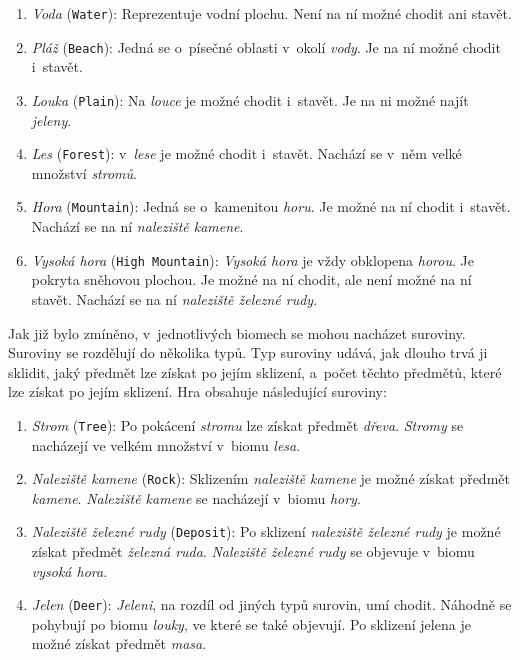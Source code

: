 \begin{enumerate}
    \item \textit{Voda} (\verb|Water|): Reprezentuje vodní plochu. Není na ní možné chodit ani stavět.
    \item \textit{Pláž} (\verb|Beach|): Jedná se o~písečné oblasti v~okolí \textit{vody}. Je na ní možné chodit i~stavět.
    \item \textit{Louka} (\verb|Plain|): Na \textit{louce} je možné chodit i~stavět. Je na ni možné najít \textit{jeleny}.
    \item \textit{Les} (\verb|Forest|): v~\textit{lese} je možné chodit i~stavět. Nachází se v~něm velké množství \textit{stromů}.
    \item \textit{Hora} (\verb|Mountain|): Jedná se o~kamenitou \textit{horu}. Je možné na ní chodit i~stavět. Nachází se na ní \textit{naleziště kamene}.
    \item \textit{Vysoká hora} (\verb|High Mountain|): \textit{Vysoká hora} je vždy obklopena \textit{horou}. Je pokryta sněhovou plochou. Je možné na ní chodit, ale není možné na ní stavět. Nachází se na ní \textit{naleziště železné rudy}.
\end{enumerate}

Jak již bylo zmíněno, v~jednotlivých biomech se mohou nacházet suroviny. Suroviny se rozdělují do několika typů. Typ suroviny udává, jak dlouho trvá ji sklidit, jaký předmět lze získat po jejím sklizení, a~počet těchto předmětů, které lze získat po jejím sklizení. Hra obsahuje následující suroviny:

\begin{enumerate}
    \item \textit{Strom} (\verb|Tree|): Po pokácení \textit{stromu} lze získat předmět \textit{dřeva}. \textit{Stromy} se nacházejí ve velkém množství v~biomu \textit{lesa}.
    \item \textit{Naleziště kamene} (\verb|Rock|): Sklizením \textit{naleziště kamene} je možné získat předmět \textit{kamene}. \textit{Naleziště kamene} se nacházejí v~biomu \textit{hory}.
    \item \textit{Naleziště železné rudy} (\verb|Deposit|): Po sklizení \textit{naleziště železné rudy} je možné získat předmět \textit{železná ruda}. \textit{Naleziště železné rudy} se objevuje v~biomu \textit{vysoká hora}.
    \item \textit{Jelen} (\verb|Deer|): \textit{Jeleni}, na rozdíl od jiných typů surovin, umí chodit. Náhodně se pohybují po biomu \textit{louky}, ve které se také objevují. Po sklizení jelena je možné získat předmět \textit{masa}.
\end{enumerate}

